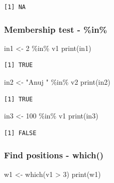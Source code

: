 \documentclass[
  letterpaper,
  DIV=11,
  numbers=noendperiod]{scrartcl}
\newenvironment{Shaded}{\begin{snugshade}}{\end{snugshade}}
\newcommand{\DecValTok}[1]{\textcolor[rgb]{0.68,0.00,0.00}{#1}}
\newcommand{\FunctionTok}[1]{\textcolor[rgb]{0.28,0.35,0.67}{#1}}
\newcommand{\NormalTok}[1]{\textcolor[rgb]{0.00,0.23,0.31}{#1}}
\newcommand{\OtherTok}[1]{\textcolor[rgb]{0.00,0.23,0.31}{#1}}
\newcommand{\SpecialCharTok}[1]{\textcolor[rgb]{0.37,0.37,0.37}{#1}}
\newcommand{\StringTok}[1]{\textcolor[rgb]{0.13,0.47,0.30}{#1}}
\begin{document}
\begin{verbatim}
[1] NA
\end{verbatim}

\subsubsection{Membership test - \%in\%}\label{membership-test---in}

\begin{Shaded}
\begin{Highlighting}[]
\NormalTok{in1 }\OtherTok{\textless{}{-}} \DecValTok{2} \SpecialCharTok{\%in\%}\NormalTok{ v1}
\FunctionTok{print}\NormalTok{(in1)}
\end{Highlighting}
\end{Shaded}

\begin{verbatim}
[1] TRUE
\end{verbatim}

\begin{Shaded}
\begin{Highlighting}[]
\NormalTok{in2 }\OtherTok{\textless{}{-}} \StringTok{"Anuj "} \SpecialCharTok{\%in\%}\NormalTok{ v2}
\FunctionTok{print}\NormalTok{(in2)}
\end{Highlighting}
\end{Shaded}

\begin{verbatim}
[1] TRUE
\end{verbatim}

\begin{Shaded}
\begin{Highlighting}[]
\NormalTok{in3 }\OtherTok{\textless{}{-}} \DecValTok{100} \SpecialCharTok{\%in\%}\NormalTok{ v1}
\FunctionTok{print}\NormalTok{(in3)}
\end{Highlighting}
\end{Shaded}

\begin{verbatim}
[1] FALSE
\end{verbatim}

\subsubsection{Find positions - which()}\label{find-positions---which}

\begin{Shaded}
\begin{Highlighting}[]
\NormalTok{w1 }\OtherTok{\textless{}{-}} \FunctionTok{which}\NormalTok{(v1 }\SpecialCharTok{\textgreater{}} \DecValTok{3}\NormalTok{)}
\FunctionTok{print}\NormalTok{(w1)}
\end{Highlighting}
\end{Shaded}
\end{document}

